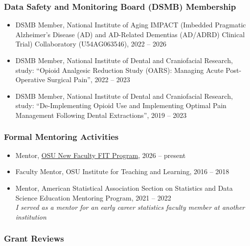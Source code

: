 \documentclass[
  english,
  letterpaper,
  DIV=11,
  numbers=noendperiod]{scrartcl}
\providecommand{\tightlist}{%
  \setlength{\itemsep}{0pt}\setlength{\parskip}{0pt}}
\begin{document}
\subsubsection{Data Safety and Monitoring Board (DSMB)
Membership}\label{data-safety-and-monitoring-board-dsmb-membership}

\begin{itemize}
\tightlist
\item
  DSMB Member, National Institute of Aging IMPACT (Imbedded Pragmatic
  Alzheimer's Disease (AD) and AD-Related Dementias (AD/ADRD) Clinical
  Trial) Collaboratory (U54AG063546), 2022 -- 2026\\
\item
  DSMB Member, National Institute of Dental and Craniofacial Research,
  study: ``Opioid Analgesic Reduction Study (OARS): Managing Acute
  Post-Operative Surgical Pain'', 2022 -- 2023\\
\item
  DSMB Member, National Institute of Dental and Craniofacial Research,
  study: ``De-Implementing Opioid Use and Implementing Optimal Pain
  Management Following Dental Extractions'', 2019 -- 2023
\end{itemize}

\subsubsection{Formal Mentoring
Activities}\label{formal-mentoring-activities}

\begin{itemize}
\tightlist
\item
  Mentor,
  \href{https://drakeinstitute.osu.edu/our-programs-and-services/faculty/new-faculty-fit}{OSU
  New Faculty FIT Program}, 2026 -- present
\item
  Faculty Mentor, OSU Institute for Teaching and Learning, 2016 -- 2018
\item
  Mentor, American Statistical Association Section on Statistics and
  Data Science Education Mentoring Program, 2021 -- 2022\\
  \emph{I served as a mentor for an early career statistics faculty
  member at another institution}
\end{itemize}

\subsubsection{Grant Reviews}\label{grant-reviews}
\end{document}
